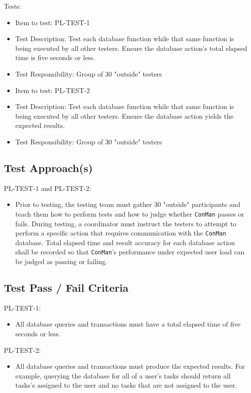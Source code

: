 \documentclass{article}
\begin{document}
Tests:
\begin{itemize}
\item Item to test: PL-TEST-1
\item Test Description: Test each database function while that same function is being 
executed by all other testers. Ensure the database action's total elapsed time is 
five seconds or less. 
\item Test Responsibility: Group of 30 "outside" testers
\end{itemize}
\begin{itemize}
\item Item to test: PL-TEST-2
\item Test Description: Test each database function while that same function is being 
executed by all other testers. Ensure the database action yields the expected results. 
\item Test Responsibility: Group of 30 "outside" testers
\end{itemize}

\subsection{Test Approach(s)}
PL-TEST-1 and PL-TEST-2:
\begin{itemize}
\item Prior to testing, the testing team must gather 30 "outside" participants 
and teach them how to perform tests and how to judge whether \texttt{ConMan} passes 
or fails. During testing, a coordinator must instruct the testers to attempt to 
perform a specific action that requires communication with the \texttt{ConMan} database. 
Total elapsed time and result accuracy for each database action shall be recorded so 
that \texttt{ConMan}'s performance under expected user load can be judged as passing 
or failing.
\end{itemize}

\subsection{Test Pass / Fail Criteria}
PL-TEST-1:
\begin{itemize}
\item All database queries and transactions must have a total elapsed time of five 
seconds or less.
\end{itemize}
PL-TEST-2:
\begin{itemize}
\item All database queries and transactions must produce the expected results. For example, 
querying the database for all of a user's tasks should return all tasks's assigned to 
the user and no tasks that are not assigned to the user.
\end{itemize}
\end{document}
